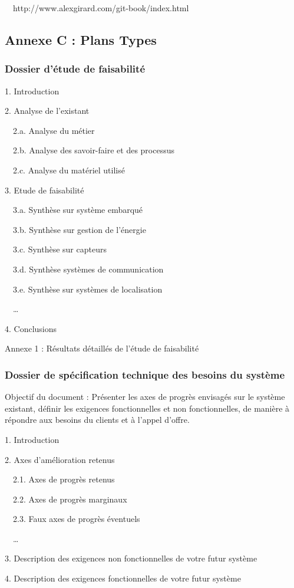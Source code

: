 \documentclass{mise_en_page}
\begin{document}
\ \ http://www.alexgirard.com/git-book/index.html




\subsection{Annexe C : Plans Types}
\subsubsection{Dossier d’étude de faisabilité}
1. Introduction

2. Analyse de l’existant

\ \ 2.a. Analyse du métier

\ \ 2.b. Analyse des savoir-faire et des processus

\ \ 2.c. Analyse du matériel utilisé

3. Etude de faisabilité

\ \ 3.a. Synthèse sur système embarqué

\ \ 3.b. Synthèse sur gestion de l’énergie

\ \ 3.c. Synthèse sur capteurs

\ \ 3.d. Synthèse systèmes de communication

\ \ 3.e. Synthèse sur systèmes de localisation

\ \ …

4. Conclusions

Annexe 1 : Résultats détaillés de l’étude de faisabilité

\subsubsection{Dossier de spécification technique des besoins du système}
Objectif du document : Présenter les axes de progrès envisagés sur le
système existant, définir les exigences fonctionnelles et non
fonctionnelles, de manière à répondre aux besoins du clients et à
l’appel d’offre.

1. Introduction

2. Axes d’amélioration retenus

\ \ 2.1. Axes de progrès retenus

\ \ 2.2. Axes de progrès marginaux

\ \ 2.3. Faux axes de progrès éventuels

\ \ …

3. Description des exigences non fonctionnelles de votre futur système

4. Description des exigences fonctionnelles de votre futur système
\end{document}
